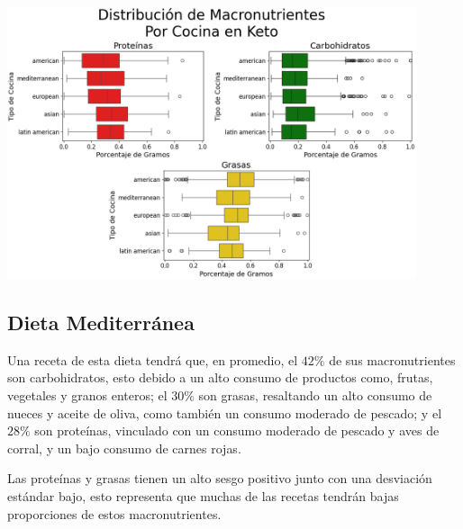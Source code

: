 \documentclass[12pt,a4paper]{article}
\begin{document}
{{{            \begin{center}
                \includegraphics[width=0.9\textwidth]{Resources/EDA/Keto_2.png}
            \end{center}
            }

            \subsection{Dieta Mediterránea}\label{anexo:C_medit}
            {
            Una receta de esta dieta tendrá que, en promedio, el $42\%$ de sus 
            macronutrientes son carbohidratos, esto debido a un alto consumo de 
            productos como, frutas, vegetales y granos enteros; el $30\%$ son 
            grasas, resaltando un alto consumo de nueces y aceite de oliva, como 
            también un consumo moderado de pescado; y el $28\%$ son proteínas, 
            vinculado con un consumo moderado de pescado y aves de corral, y un 
            bajo consumo de carnes rojas.\newline 
            
            Las proteínas y grasas tienen un alto 
            sesgo positivo junto con una desviación estándar bajo, esto representa 
            que muchas de las recetas tendrán bajas proporciones de estos macronutrientes.

}}}
\end{document}

